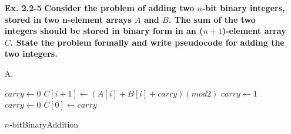 \documentclass[fontsize=12pt,paper=a4,open=any]{book}
\begin{document}
\begin{enumerate}
	\item[\textbf{Ex. 2.2-5}]
		\textbf{Consider the problem of adding two $n$-bit binary integers, stored in two n-element arrays $A$ and $B$. The sum of the two integers should be stored in binary form in an ($n+1$)-element array $C$. State the problem formally and write pseudocode for adding the two integers.}

	\item[A.]
		\begin{algorithm}[H]

			\DontPrintSemicolon

			$carry \longleftarrow 0$\;
			{
				$C[i+1] \longleftarrow (A[i] + B[i]+carry) (mod 2)$\;
				{
					$carry \longleftarrow 1$\;
				}
				\Else
				{
					$carry \longleftarrow 0$\;
				}
			}
			$C[0] \longleftarrow carry$\;
			\caption{$n$-bitBinaryAddition}
		\end{algorithm}

\end{enumerate}
\end{document}
